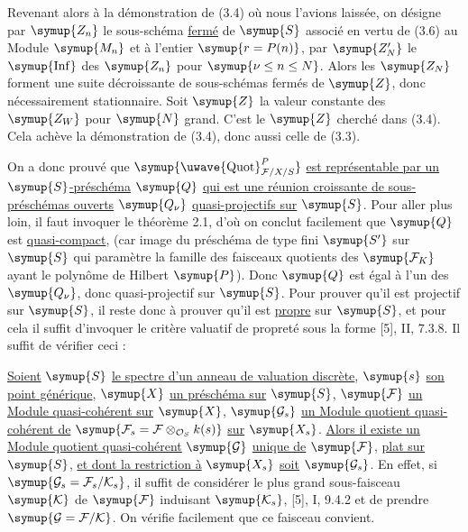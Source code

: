 Revenant alors à la démonstration de (3.4) où nous l'avions laissée, on désigne
par $\symup{Z_n}$ le sous-schéma \uline{fermé} de $\symup{S}$ associé en vertu de (3.6) au Module $\symup{M_n}$
et à l'entier $\symup{r=P(n)}$, par $\symup{Z'_N}$ le $\symup{\operatorname{Inf}}$ des $\symup{Z_n}$ pour
$\symup{\nu\leq n\leq N}$. Alors les $\symup{Z_N}$ forment une suite décroissante de
sous-schémas fermés de $\symup{Z}$, donc nécessairement stationnaire. Soit $\symup{Z}$ la
valeur constante des $\symup{Z_W}$ pour $\symup{N}$ grand. C'est le $\symup{Z}$ cherché dans (3.4).
Cela achève la démonstration de (3.4), donc aussi celle de (3.3).

On a donc prouvé que
$\symup{\mathop{\text{\uwave{Quot}}}\nolimits^P_{\mathcal F/X/S}}$ \uline{est représentable par un}
$\symup{S}$\uline{-préschéma} $\symup{Q}$ \uline{qui est une réunion croissante de sous-préschémas ouverts}
$\symup{Q_\nu}$ \uline{quasi-projectifs sur} $\symup{S}$. Pour aller plus loin, il faut invoquer le
théorème 2.1, d'où on conclut facilement que $\symup{Q}$ est \uline{quasi-compact}, (car image du
préschéma de type fini $\symup{S'}$ sur $\symup{S}$ qui paramètre la famille des faisceaux
quotients des $\symup{\mathcal F_K}$ ayant le polynôme de Hilbert $\symup{P}$). Donc $\symup{Q}$ est
égal à l'un des $\symup{Q_\nu}$, donc quasi-projectif sur $\symup{S}$. Pour prouver qu'il est
projectif sur $\symup{S}$, il reste donc à prouver qu'il est \uline{propre} sur $\symup{S}$, et pour
cela il suffit d'invoquer le critère valuatif de propreté sous la forme [5],
II, 7.3.8. Il suffit de vérifier ceci :

 \uline{Soient} $\symup{S}$ \uline{le spectre d'un anneau de valuation discrète},
$\symup{s}$ \uline{son point générique}, $\symup{X}$ \uline{un préschéma sur} $\symup{S}$, $\symup{\mathcal F}$ \uline{un Module
quasi-cohérent sur} $\symup{X}$, $\symup{\mathcal G_s}$ \uline{un Module quotient quasi-cohérent de}
$\symup{\mathcal F_s=\mathcal F\otimes_{\mathcal O_S}k(s)}$ \uline{sur} $\symup{X_s}$. \uline{Alors il existe
un Module quotient quasi-cohérent} $\symup{\mathcal G}$ \uline{unique de} $\symup{\mathcal F}$, \uline{plat sur}
$\symup{S}$, \uline{et dont la restriction à} $\symup{X_s}$ \uline{soit} $\symup{\mathcal G_s}$.
En effet, si $\symup{\mathcal G_s=\mathcal F_s/\mathcal K_s}$, il suffit de considérer
le plus grand sous-faisceau $\symup{\mathcal K}$ de $\symup{\mathcal F}$ induisant
$\symup{\mathcal K_s}$, [5], I, 9.4.2 et de prendre
$\symup{\mathcal G=\mathcal F/\mathcal K}$. On vérifie facilement que ce faisceau
convient.

